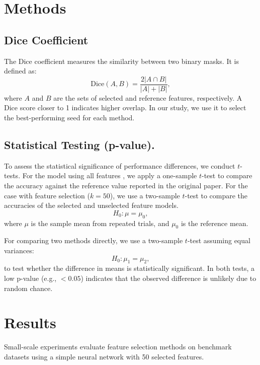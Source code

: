 \documentclass[a4paper,twocolumn]{article} %
\begin{document}
\section{Methods}
\subsection{Dice Coefficient}
The Dice coefficient measures the similarity between two binary masks. It is defined as:
\begin{equation}
    \mathrm{Dice}(A, B) = \frac{2|A \cap B|}{|A| + |B|},
\end{equation}
where $A$ and $B$ are the sets of selected and reference features, respectively. A Dice score closer to 1 indicates higher overlap. In our study, we use it to select the best-performing seed for each method.
\subsection{Statistical Testing (p-value).}
To assess the statistical significance of performance differences, we conduct $t$-tests. For the model using all features , we apply a one-sample $t$-test to compare the accuracy against the reference value reported in the original paper. For the case with feature selection ($k=50$), we use a two-sample $t$-test to compare the accuracies of the selected and unselected feature models.
\begin{equation}
    H_0: \mu = \mu_0,
\end{equation}
where $\mu$ is the sample mean from repeated trials, and $\mu_0$ is the reference mean.

For comparing two methods directly, we use a two-sample $t$-test assuming equal variances:
\begin{equation}
    H_0: \mu_1 = \mu_2,
\end{equation}
to test whether the difference in means is statistically significant. In both tests, a low p-value (e.g., $< 0.05$) indicates that the observed difference is unlikely due to random chance.

\section{Results}
Small-scale experiments evaluate feature selection methods on benchmark datasets using a simple neural network with 50 selected features.
\end{document}
